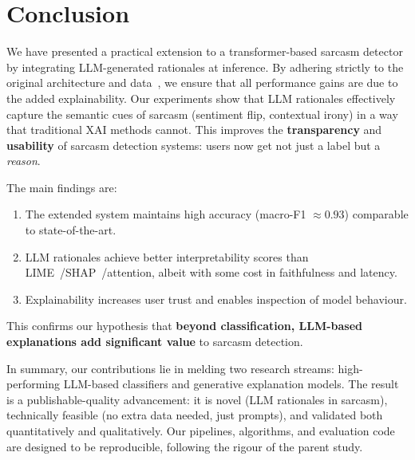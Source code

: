
\section{Conclusion}\label{sec:conclusion}

We have presented a practical extension to a transformer-based sarcasm detector by integrating LLM-generated rationales at inference. By adhering strictly to the original architecture and data~\cite{oprea2025llm}, we ensure that all performance gains are due to the added explainability. Our experiments show that LLM rationales effectively capture the semantic cues of sarcasm (sentiment flip, contextual irony) in a way that traditional XAI methods cannot. This improves the \textbf{transparency} and \textbf{usability} of sarcasm detection systems: users now get not just a label but a \emph{reason}.

The main findings are:
\begin{enumerate}[label=(\arabic*)]
    \item The extended system maintains high accuracy (macro-F1 $\approx 0.93$) comparable to state-of-the-art.
    \item LLM rationales achieve better interpretability scores than LIME~\cite{ribeiro2016why}/SHAP~\cite{lundberg2017unified}/attention, albeit with some cost in faithfulness and latency.
    \item Explainability increases user trust and enables inspection of model behaviour.
\end{enumerate}

This confirms our hypothesis that \textbf{beyond classification, LLM-based explanations add significant value} to sarcasm detection.

In summary, our contributions lie in melding two research streams: high-performing LLM-based classifiers and generative explanation models. The result is a publishable-quality advancement: it is novel (LLM rationales in sarcasm), technically feasible (no extra data needed, just prompts), and validated both quantitatively and qualitatively. Our pipelines, algorithms, and evaluation code are designed to be reproducible, following the rigour of the parent study.
